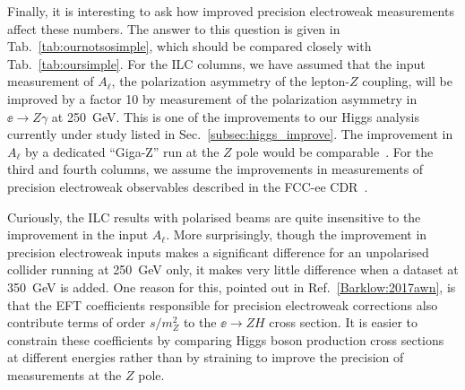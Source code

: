 Finally, it is interesting to ask how improved precision electroweak
measurements affect these numbers. The answer to this question is
given in Tab.~\ref{tab:ournotsosimple}, which should be compared 
closely with Tab.~\ref{tab:oursimple}.   For the ILC columns, we have 
assumed that the input measurement of $A_\ell$, the polarization
asymmetry of the lepton-$Z$ coupling, will be improved by a factor 10
by measurement of the polarization asymmetry in $\ee\to Z\gamma$ at
250~GeV.   This is one of the improvements to our Higgs analysis
currently under study listed in Sec.~\ref{subsec:higgs_improve}.   The
improvement in $A_\ell$ by a dedicated ``Giga-Z''  run at the $Z$ pole
would be comparable~\cite{Baer:2013cma}.  For the third and fourth columns, we assume the
improvements in measurements of precision electroweak observables
described in the FCC-ee CDR~\cite{Benedikt:2018qee}.

Curiously, the ILC results with polarised beams are quite insensitive
to the improvement in the input $A_\ell$.   More surprisingly, though
the improvement in precision electroweak inputs makes a significant
difference for an unpolarised collider running at 250~GeV only, it
makes very little difference when a dataset at 350~GeV is added.  One
reason for this, pointed out in Ref.~\ref{Barklow:2017awn}, is that
the EFT coefficients responsible for precision electroweak corrections
also contribute terms of order $s/m_Z^2$ to the $\ee\to ZH$ cross
section.   It is easier to constrain these coefficients
by comparing Higgs boson production cross sections at different
energies rather than by straining to improve the precision of
measurements at the $Z$ pole.







